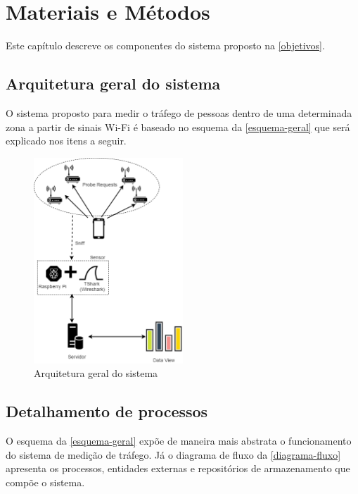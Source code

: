 
\chapter{Materiais e Métodos}
\label{metodologia}
Este capítulo descreve os componentes do sistema proposto na \autoref{objetivos}.

\section{Arquitetura geral do sistema}
O sistema proposto para medir o tráfego de pessoas dentro de uma determinada
zona a partir de sinais Wi-Fi é baseado no esquema da \autoref{esquema-geral}
que será explicado nos itens a seguir.

\begin{figure}[!h]
  \caption{\label{esquema-geral}Arquitetura geral do sistema}
  \begin{center}
    \includegraphics[width=0.50\textwidth]{img/esquema_geral.png}
  \end{center}
\end{figure}

\section{Detalhamento de processos}
O esquema da \autoref{esquema-geral} expõe de maneira mais abstrata o
funcionamento do sistema de medição de tráfego. Já o diagrama de fluxo da
\autoref{diagrama-fluxo} apresenta os processos, entidades externas e
repositórios de armazenamento que compõe o sistema.

